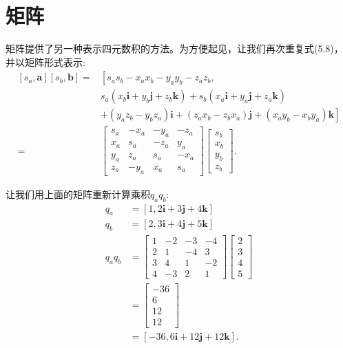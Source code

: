\section{矩阵}
矩阵提供了另一种表示四元数积的方法。为方便起见，让我们再次重复式(5.8)，并以矩阵形式表示:
$$
\begin{aligned}
{\left[s_{a}, \mathbf{a}\right]\left[s_{b}, \mathbf{b}\right]=} & {\left[s_{a} s_{b}-x_{a} x_{b}-y_{a} y_{b}-z_{a} z_{b},\right.} \\
& s_{a}\left(x_{b} \mathbf{i}+y_{b} \mathbf{j}+z_{b} \mathbf{k}\right)+s_{b}\left(x_{a} \mathbf{i}+y_{a} \mathbf{j}+z_{a} \mathbf{k}\right) \\
& \left.+\left(y_{a} z_{b}-y_{b} z_{a}\right) \mathbf{i}+\left(z_{a} x_{b}-z_{b} x_{a}\right) \mathbf{j}+\left(x_{a} y_{b}-x_{b} y_{a}\right) \mathbf{k}\right] \\
= & {\left[\begin{array}{cccc}
s_{a} & -x_{a} & -y_{a} & -z_{a} \\
x_{a} & s_{a} & -z_{a} & y_{a} \\
y_{a} & z_{a} & s_{a} & -x_{a} \\
z_{a} & -y_{a} & x_{a} & s_{a}
\end{array}\right]\left[\begin{array}{c}
s_{b} \\
x_{b} \\
y_{b} \\
z_{b}
\end{array}\right] . }
\end{aligned}
$$

让我们用上面的矩阵重新计算乘积$q_{a} q_{b}$:
$$
\begin{aligned}
q_{a} & =[1,2 \mathbf{i}+3 \mathbf{j}+4 \mathbf{k}] \\
q_{b} & =[2,3 \mathbf{i}+4 \mathbf{j}+5 \mathbf{k}] \\
q_{a} q_{b} & =\left[\begin{array}{cccc}
1 & -2 & -3 & -4 \\
2 & 1 & -4 & 3 \\
3 & 4 & 1 & -2 \\
4 & -3 & 2 & 1
\end{array}\right]\left[\begin{array}{l}
2 \\
3 \\
4 \\
5
\end{array}\right] \\
& =\left[\begin{array}{c}
-36 \\
6 \\
12 \\
12
\end{array}\right] \\
& =[-36,6 \mathbf{i}+12 \mathbf{j}+12 \mathbf{k}] .
\end{aligned}
$$

